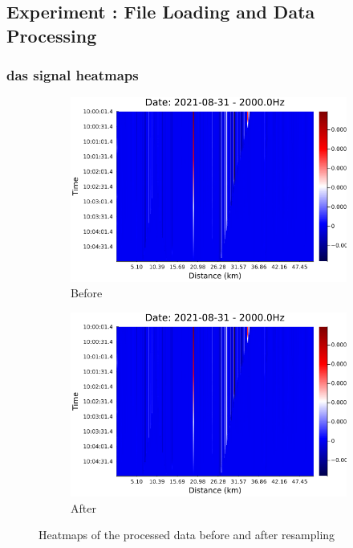 \subsection{Experiment : File Loading and Data Processing}


\subsubsection{\acrshort{das} signal heatmaps}

\begin{figure}[!h]
    \centering
    \begin{subfigure}{0.45\linewidth}
        \centering
        \includegraphics[width=\linewidth]{figures/heatmap_das_test.png}
        \caption{Before}
        \label{fig:dasoutput1}
    \end{subfigure}
    \hfill
    \begin{subfigure}{0.45\linewidth}
        \centering
        \includegraphics[width=\linewidth]{figures/heatmap_das_test.png}
        \caption{After}
        \label{fig:dasoutput2}
    \end{subfigure}
    \caption{Heatmaps of the processed data before and after resampling}
    \label{fig:dasoutput}
\end{figure}

